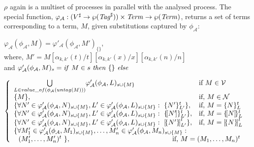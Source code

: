 \documentclass{entcs} \usepackage{entcsmacro}
\begin{document}
$\rho$ again is a multiset of processes in parallel with the analysed process.  The special function, $\varphi_\mathcal{A}:(V^\sharp\to\wp(\mbox{{\itshape Tag\/}}^\sharp))\times\mbox{{\itshape Term\/}}\to\wp(\mbox{{\itshape Term\/}})$, returns a set of terms corresponding to a term, $M$, given substitutions captured by $\phi_\mathcal{A}$:

\noindent
$\varphi_\mathcal{A}(\phi_\mathcal{A},M)=\varphi'_\mathcal{A}(\phi_\mathcal{A},M')_{\{\}}$,\\where, $M'=M[\alpha_{k,k'}(t)/t][\alpha_{k,k'}(x)/x][\alpha_{k,k'}(n)/n]$\\and $\varphi'_\mathcal{A}(\phi_\mathcal{A},M)_s=\mbox{{\itshape if\/} }M\in s\mbox{ {\itshape then\/} }\{\}\mbox{ {\itshape else\/}}$\vspace{5mm}

\noindent
$\left\{\begin{array}{ll}
\underset{L\in value\_of(\phi_\mathcal{A}(untag(M)))}{\bigcup}\varphi'_\mathcal{A}(\phi_\mathcal{A},L)_{s\cup\{M\}}&\mbox{if }M\in\mathcal{V}\\
\{M\},&\mbox{if, }M\in\mathcal{N}\\
\{\forall N'\in\varphi'_\mathcal{A}(\phi_\mathcal{A},N)_{s\cup\{M\}},L'\in\varphi'_\mathcal{A}(\phi_\mathcal{A},L)_{s\cup\{M\}}:~\{N'\}^t_{L'}\},&\mbox{if, }M=\{N\}^t_{L}\\
\{\forall N'\in\varphi'_\mathcal{A}(\phi_\mathcal{A},N)_{s\cup\{M\}},L'\in\varphi'_\mathcal{A}(\phi_\mathcal{A},L)_{s\cup\{M\}}:~\{\!{[}N'\!{]}\}^t_{L'}\},&\mbox{if, }M=\{\![N]\!\}^t_{L}\\
\{\forall N'\in\varphi'_\mathcal{A}(\phi_\mathcal{A},N)_{s\cup\{M\}},L'\in\varphi'_\mathcal{A}(\phi_\mathcal{A},L)_{s\cup\{M\}}:~{[}\!\{N'\}\!{]}^t_{L'}\},&\mbox{if, }M={[}\!\{N\}\!{]}^t_{L}\\
\multicolumn{2}{l}{\{\forall M'_1\in\varphi'_\mathcal{A}(\phi_\mathcal{A},M_1)_{s\cup\{M\}},\ldots,M'_n\in\varphi'_\mathcal{A}(\phi_\mathcal{A},M_n)_{s\cup\{M\}}:}\\
\multicolumn{2}{l}{~~(M'_1,\ldots,M'_n)^t~\},\hspace{52mm}\mbox{if, }M=(M_1,\ldots,M_n)^{t}}
\end{array}\right.$\vspace{5mm}
\end{document}
